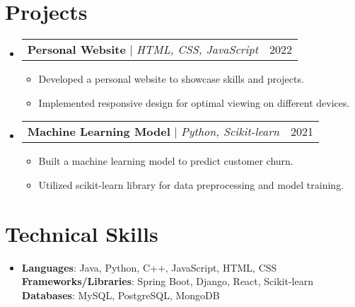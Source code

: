 \documentclass[letterpaper,11pt]{article}
\makeatletter
\newcommand{\resumeItem}[1]{
\item\small{
{#1 \vspace{-2pt}}
}
}
\newcommand{\resumeProjectHeading}[2]{
\item
\begin{tabular*}{0.97\textwidth}{l@{\extracolsep{\fill}}r}
\small#1 & #2 \\
\end{tabular*}\vspace{-7pt}
}
\newcommand{\resumeSubHeadingListStart}{\begin{itemize}[leftmargin=0.15in, label={}]}
\newcommand{\resumeSubHeadingListEnd}{\end{itemize}}
\newcommand{\resumeItemListStart}{\begin{itemize}}
\newcommand{\resumeItemListEnd}{\end{itemize}\vspace{-5pt}}
\makeatother
\begin{document}
\section{Projects}
\resumeSubHeadingListStart
\resumeProjectHeading{\textbf{Personal Website} $|$ \emph{HTML, CSS, JavaScript}}{2022}
\resumeItemListStart
\resumeItem{Developed a personal website to showcase skills and projects.}
\resumeItem{Implemented responsive design for optimal viewing on different devices.}
\resumeItemListEnd

\resumeProjectHeading{\textbf{Machine Learning Model} $|$ \emph{Python, Scikit-learn}}{2021}
\resumeItemListStart
\resumeItem{Built a machine learning model to predict customer churn.}
\resumeItem{Utilized scikit-learn library for data preprocessing and model training.}
\resumeItemListEnd
\resumeSubHeadingListEnd

\section{Technical Skills} %
\begin{itemize}[leftmargin=0.15in, label={}]
\item{
\textbf{Languages}{: Java, Python, C++, JavaScript, HTML, CSS} \\
\textbf{Frameworks/Libraries}{: Spring Boot, Django, React, Scikit-learn} \\
\textbf{Databases}{: MySQL, PostgreSQL, MongoDB}
} \\
\end{itemize}


\end{document}

